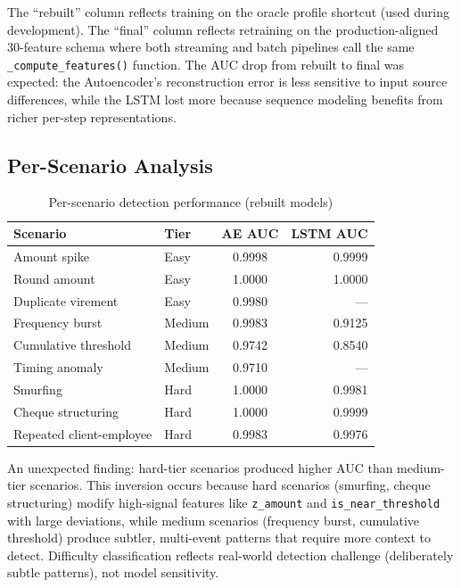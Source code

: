 The ``rebuilt'' column reflects training on the oracle profile shortcut (used
during development). The ``final'' column reflects retraining on the
production-aligned 30-feature schema where both streaming and batch
pipelines call the same \texttt{\_compute\_features()} function. The AUC
drop from rebuilt to final was expected: the Autoencoder's reconstruction
error is less sensitive to input source differences, while the LSTM lost
more because sequence modeling benefits from richer per-step representations.

\subsection{Per-Scenario Analysis}

\begin{table}[H]
\centering
\caption{Per-scenario detection performance (rebuilt models)}
\label{tab:per-scenario}
\begin{tabular}{@{}llcr@{}}
\toprule
\textbf{Scenario} & \textbf{Tier} & \textbf{AE AUC} & \textbf{LSTM AUC} \\
\midrule
Amount spike            & Easy   & 0.9998 & 0.9999 \\
Round amount            & Easy   & 1.0000 & 1.0000 \\
Duplicate virement      & Easy   & 0.9980 & --- \\
Frequency burst         & Medium & 0.9983 & 0.9125 \\
Cumulative threshold    & Medium & 0.9742 & 0.8540 \\
Timing anomaly          & Medium & 0.9710 & --- \\
Smurfing                & Hard   & 1.0000 & 0.9981 \\
Cheque structuring      & Hard   & 1.0000 & 0.9999 \\
Repeated client-employee & Hard  & 0.9983 & 0.9976 \\
\bottomrule
\end{tabular}
\end{table}

An unexpected finding: hard-tier scenarios produced higher AUC than
medium-tier scenarios. This inversion occurs because hard scenarios (smurfing,
cheque structuring) modify high-signal features like \texttt{z\_amount} and
\texttt{is\_near\_threshold} with large deviations, while medium scenarios
(frequency burst, cumulative threshold) produce subtler, multi-event patterns
that require more context to detect. Difficulty classification reflects
real-world detection challenge (deliberately subtle patterns), not model
sensitivity.

